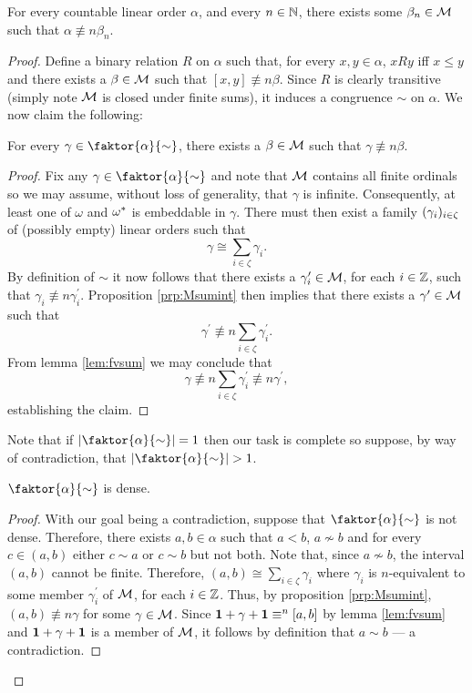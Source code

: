 \begin{thm}\label{thm:LLlin}
	For every countable linear order $\alpha$, and every $n\in\mathbb{N}$, there exists some $\beta_n\in\mathcal{M}$ such that $\alpha\nequiv{n}\beta_n$.
\end{thm}
\begin{proof}
	Define a binary relation $R$ on $\alpha$ such that, for every $x,y\in\alpha$, $xRy$ iff $x\leq y$ and there exists a $\beta\in\mathcal{M}$ such that $[x,y]\nequiv{n}\beta$.  Since $R$ is clearly transitive (simply note $\mathcal{M}$ is closed under finite sums), it induces a congruence $\sim$ on $\alpha$.    We now claim the following:
	\begin{claim}
		For every $\gamma\in\faktor{\alpha}{\sim}$, there exists a $\beta\in\mathcal{M}$ such that $\gamma\nequiv{n}\beta$.
	\end{claim}
	\begin{proof}
		Fix any $\gamma\in\faktor{\alpha}{\sim}$ and note that $\mathcal{M}$ contains all finite ordinals so we may assume, without loss of generality, that $\gamma$ is infinite.  Consequently, at least one of $\omega$ and ${\omega}^\ast$ is embeddable in $\gamma$.  There must then exist a family $(\gamma_i)_{i\in\zeta}$ of (possibly empty) linear orders such that
		\begin{equation}
			\gamma\cong\sum_{i\in\zeta}\gamma_i.
		\end{equation}
		By definition of $\sim$ it now follows that there exists a $\gamma_i^\prime\in\mathcal{M}$, for each $i\in\mathbb{Z}$, such that $\gamma_i\nequiv{n}\gamma_i^\prime$.  Proposition \ref{prp:Msumint} then implies that there exists a $\gamma^\prime\in\mathcal{M}$ such that
		\begin{equation}
			\gamma^\prime\nequiv{n}\sum_{i\in\zeta}\gamma_i^\prime.
		\end{equation}
		From lemma \ref{lem:fvsum} we may conclude that
		\begin{equation}
			\gamma\nequiv{n}\sum_{i\in\zeta}\gamma_i^\prime\nequiv{n}\gamma^\prime,
		\end{equation}
		establishing the claim.
	\end{proof}

	Note that if $\card{\faktor{\alpha}{\sim}}=1$ then our task is complete so suppose, by way of contradiction, that $\card{\faktor{\alpha}{\sim}}>1$.
	\begin{claim}
		$\faktor{\alpha}{\sim}$ is dense.
	\end{claim}
	\begin{proof}
		With our goal being a contradiction, suppose that $\faktor{\alpha}{\sim}$ is not dense.  Therefore, there exists $a,b\in\alpha$ such that $a<b$, $a\not\sim b$ and for every $c\in(a,b)$ either $c\sim a$ or $c\sim b$ but not both.  Note that, since $a\not\sim b$, the interval $(a,b)$ cannot be finite.  Therefore, $(a,b)\cong\sum_{i\in\zeta}\gamma_i$ where $\gamma_i$ is $n$-equivalent to some member $\gamma_i^\prime$ of $\mathcal{M}$, for each $i\in\mathbb{Z}$.  Thus, by proposition \ref{prp:Msumint}, $(a,b)\nequiv{n}\gamma$ for some $\gamma\in\mathcal{M}$.  Since $\mathbf{1}+\gamma+\mathbf{1}\equiv^{n}[a,b]$ by lemma \ref{lem:fvsum} and $\mathbf{1}+\gamma+\mathbf{1}$ is a member of $\mathcal{M}$, it follows by definition that $a\sim b$ --- a contradiction.
	\end{proof}


\end{proof}
